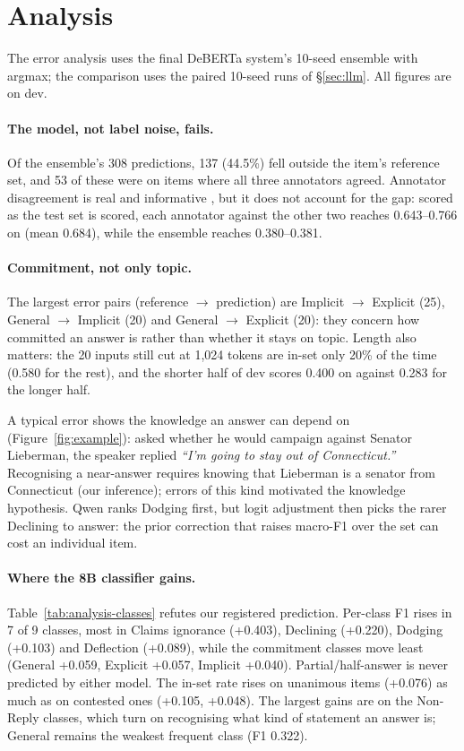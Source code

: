\section{Analysis}\label{sec:analysis}

The error analysis uses the final DeBERTa system's 10-seed ensemble with argmax; the
comparison uses the paired 10-seed runs of \S\ref{sec:llm}. All figures are on dev.

\paragraph{The model, not label noise, fails.}
Of the ensemble's 308 predictions, 137 (44.5\%) fell outside the item's reference set,
and 53 of these were on items where all three annotators agreed. Annotator disagreement
is real and informative \citep{uma2021learning}, but it does not account for the gap:
scored as the test set is scored, each annotator against the other two reaches
0.643--0.766 on \Stwo{} (mean 0.684), while the ensemble reaches 0.380--0.381.

\paragraph{Commitment, not only topic.}
The largest error pairs (reference $\rightarrow$ prediction) are Implicit $\rightarrow$
Explicit (25), General $\rightarrow$ Implicit (20) and General $\rightarrow$ Explicit
(20): they concern how committed an answer is rather than whether it stays on topic.
Length also matters: the 20 inputs still cut at 1,024 tokens are in-set only 20\% of the
time (0.580 for the rest), and the shorter half of dev scores 0.400 on \Stwo{} against
0.283 for the longer half.

\FigureExample
A typical error shows the knowledge an answer can depend on (Figure~\ref{fig:example}):
asked whether he would campaign against Senator Lieberman, the speaker replied \emph{``I'm
going to stay out of Connecticut.''} Recognising a near-answer requires knowing that
Lieberman is a senator from Connecticut (our inference); errors of this kind motivated the
knowledge hypothesis. Qwen ranks Dodging first, but logit adjustment then picks the rarer
Declining to answer: the prior correction that raises macro-F1 over the set can cost an
individual item.

\paragraph{Where the 8B classifier gains.}
Table~\ref{tab:analysis-classes} refutes our registered prediction. Per-class F1 rises in
7 of 9 classes, most in Claims ignorance (+0.403), Declining (+0.220), Dodging (+0.103) and
Deflection (+0.089), while the commitment classes move least (General +0.059, Explicit
+0.057, Implicit +0.040). Partial/half-answer is never predicted by either model. The
in-set rate rises on unanimous items (+0.076) as much as on contested ones (+0.105,
+0.048). The largest gains are on the Non-Reply classes, which turn on recognising what
kind of statement an answer is; General remains the weakest frequent class (F1 0.322).

